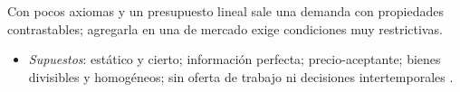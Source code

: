 \documentclass{article}
\begin{document}
\begin{columnas}
\begin{ideaclave}
Con pocos axiomas y un presupuesto lineal sale una demanda con propiedades contrastables; agregarla en una de mercado exige condiciones muy restrictivas.
\end{ideaclave}
\begin{itemize}
\item \emph{Supuestos}: estático y cierto; información perfecta; precio-aceptante; bienes divisibles y homogéneos; sin oferta de trabajo  ni decisiones intertemporales .
\end{itemize}


\end{columnas}
\end{document}
